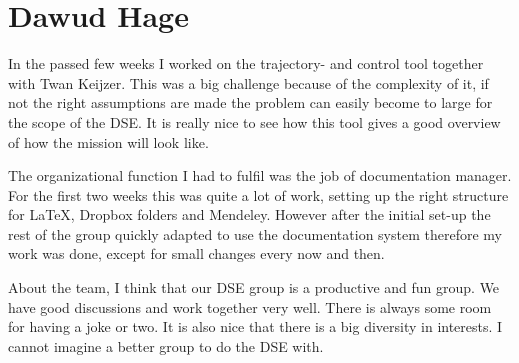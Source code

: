 \section{Dawud Hage}


In the passed few weeks I worked on the trajectory- and control tool together with Twan Keijzer. This was a big challenge because of the complexity of it, if not the right assumptions are made the problem can easily become to large for the scope of the DSE. It is really nice to see how this tool gives a good overview of how the mission will look like.

The organizational function I had to fulfil was the job of documentation manager. For the first two weeks this was quite a lot of work, setting up the right structure for LaTeX, Dropbox folders and Mendeley. However after the initial set-up the rest of the group quickly adapted to use the documentation system therefore my work was done, except for small changes every now and then.

About the team, I think that our DSE group is a productive and fun group. We have good discussions and work together very well. There is always some room for having a joke or two. It is also nice that there is a big diversity in interests. I cannot imagine a better group to do the DSE with.